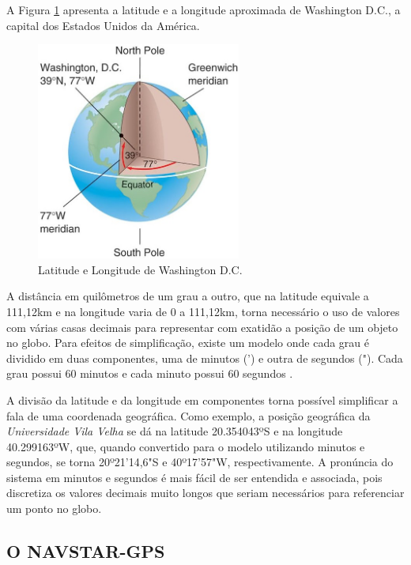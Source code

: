 A Figura \ref{washingtonDC} apresenta a latitude e a longitude aproximada de Washington D.C., a capital dos Estados Unidos da América.

\begin{figure}[htp!]
\centering
\includegraphics[width=0.60\textwidth]{figuras/cap_2/secao_3/washingtonDC.jpg}
\caption{Latitude e Longitude de Washington D.C.}
\label{washingtonDC}
\end{figure}

A distância em quilômetros de um grau a outro, que na latitude equivale a 111,12km e na longitude varia de 0 a 111,12km, torna necessário o uso de valores com várias casas decimais para representar com exatidão a posição de um objeto no globo. Para efeitos de simplificação, existe um modelo onde cada grau é dividido em duas componentes, uma de minutos (') e outra de segundos ("). Cada grau possui 60 minutos e cada minuto possui 60 segundos \cite{fitz2008geoprocessamento}. 

A divisão da latitude e da longitude em componentes torna possível simplificar a fala de uma coordenada geográfica. Como exemplo, a posição geográfica da \emph{Universidade Vila Velha} se dá na latitude 20.354043ºS e na longitude 40.299163ºW, que, quando convertido para o modelo utilizando minutos e segundos, se torna \newline 20º21'14,6"S e 40º17'57"W, respectivamente. A pronúncia do sistema em minutos e segundos é mais fácil de ser entendida e associada, pois discretiza os valores decimais muito longos que seriam necessários para referenciar um ponto no globo.

\subsection{O NAVSTAR-GPS}

